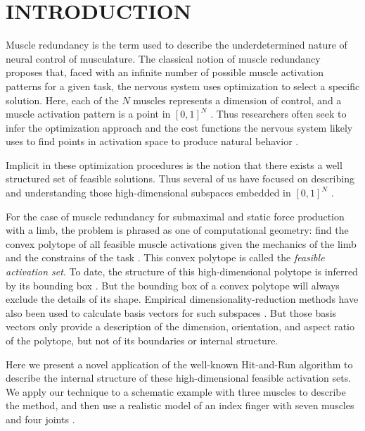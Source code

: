 
\section{INTRODUCTION}

Muscle redundancy is the term used to describe the underdetermined nature of neural control of musculature.
The classical notion of muscle redundancy  proposes that, faced with an infinite number of possible muscle activation patterns for a given task, the nervous system uses optimization to select a specific solution.
Here, each of the $N$ muscles represents a dimension of control, and a muscle activation pattern is a point in $[0,1]^N$ \cite{Valero-Cuevas1998Large}.
Thus researchers often seek to infer the optimization approach and the cost functions the nervous system likely uses to find points in activation space to produce natural behavior \cite{Chao1978Graphical,Prilutsky2000Muscle,scott2004optimal,todorov2002optimal,crowninshield1981physiologically,higginson2005simulated}. 


Implicit in these optimization procedures is the notion that there exists a well structured set of feasible solutions. Thus several of us have focused on describing and understanding those high-dimensional subspaces  embedded in $[0,1]^N$ \cite{kutch2011muscle,kutch2012challenges,sohn2013cat_bounding_box,Valero-Cuevas1998Large,Valero-Cuevas2015high-dimensional}.

For the case of muscle redundancy for submaximal and static force production with a limb,  the problem is phrased as one of computational geometry: find the convex polytope of all feasible muscle activations given the mechanics of the limb and the constrains of the task \cite{avis1992Pivoting,Valero-Cuevas1998Large,Valero-Cuevas2009mathematical,Valero-Cuevas2015high-dimensional}.
This convex polytope is called the \emph{feasible activation set}.
To date, the structure of this high-dimensional polytope is inferred by its bounding box  \cite{kutch2011muscle,sohn2013cat_bounding_box,Valero-Cuevas2015high-dimensional}.
But the bounding box of a convex polytope will always exclude the details of its shape.
Empirical dimensionality-reduction methods have also been used to calculate basis vectors for such subspaces \cite{Clewley2008Estimating,davella2005shared,krishnamoorthy2003muscle}.
But those basis vectors only provide a description of the dimension, orientation, and aspect ratio of the polytope, but not of its boundaries or internal  structure.

Here we present a novel application of the well-known Hit-and-Run algorithm \cite{smith1984efficient} to describe the internal structure of these high-dimensional feasible activation sets. We apply our technique to a schematic example with three muscles to describe the method, and then use a realistic model of an index finger with seven muscles and four joints \cite{Valero-Cuevas1998Large}.